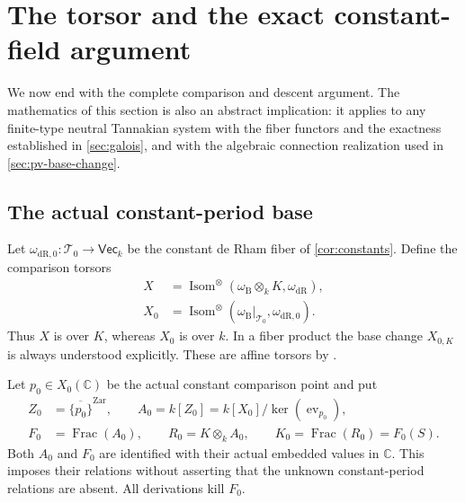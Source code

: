 \documentclass[11pt]{article}
\numberwithin{equation}{section}
\theoremstyle{definition}
\theoremstyle{remark}
\newcommand{\C}{\mathbb C}
\newcommand{\Tcal}{\mathcal T}
\newcommand{\VecCat}{\mathsf{Vec}}
\newcommand{\Isom}{\operatorname{Isom}}
\newcommand{\Frac}{\operatorname{Frac}}
\newcommand{\dR}{\mathrm{dR}}
\newcommand{\B}{\mathrm B}
\begin{document}
\section{The torsor and the exact constant-field argument}\label{sec:torsor}

We now end with the complete comparison and descent argument. The
mathematics of this section is also an abstract implication: it applies to
any finite-type neutral Tannakian system with the fiber functors and the
exactness established in \cref{sec:galois}, and with the algebraic
connection realization used in \cref{sec:pv-base-change}.

\subsection{The actual constant-period base}

Let $\omega_{\dR,0}:\Tcal_0\to\VecCat_k$ be the constant de Rham fiber
of \cref{cor:constants}. Define the comparison torsors
\begin{align*}
 X&=\Isom^\otimes(\omega_\B\otimes_k K,\omega_\dR),\\
 X_0&=\Isom^\otimes(\omega_\B|_{\Tcal_0},\omega_{\dR,0}).
\end{align*}
Thus $X$ is over $K$, whereas $X_0$ is over $k$. In a fiber product the
base change $X_{0,K}$ is always understood explicitly. These are affine
torsors by \cite[Theorem~3.2]{DeligneMilne}.

Let $p_0\in X_0(\C)$ be the actual constant comparison point and put
\begin{equation}\label{eq:actual-base}
 \begin{split}
 Z_0&=\overline{\{p_0\}}^{\mathrm{Zar}},\qquad
 A_0=k[Z_0]=k[X_0]/\ker(\operatorname{ev}_{p_0}),\\
 F_0&=\Frac(A_0),\qquad R_0=K\otimes_k A_0,\qquad
 K_0=\Frac(R_0)=F_0(S).
 \end{split}
\end{equation}
Both $A_0$ and $F_0$ are identified with their actual embedded values in
$\C$. This imposes their relations without asserting that the unknown
constant-period relations are absent. All derivations kill $F_0$.
\end{document}
